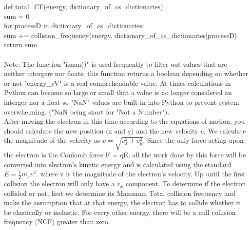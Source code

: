 \documentclass[12pt]{article}
\begin{document}
{\selectfont def total\_CF(energy, dictionary\_of\_cs\_dictionaries):\\
	\hspace*{2ex}sum = 0\\
	\hspace*{2ex}for processD in dictionary\_of\_cs\_dictionaries:\\
	\hspace*{4ex}sum += collision\_frequency(energy, dictionary\_of\_cs\_dictionaries[processD)\\
	\hspace*{2ex}return sum\\
	\\}
Note: The function "isnan()" is used frequently to filter out values that are neither intergers nor floats; this function returns a boolean depending on whether or not "energy\_eV" is a real comprehendable value. At times
calculations in Python can become so large or small that a value is no longer considered an interger nor a float so "NaN" values are built-in into Python to prevent system overwhelming.
("NaN being short for "Not a Number").\\




After moving the electron in this time according to the equations of motion, you should calculate the new position (x and y) and the new velocity $v$. We calculate the magnitude of the velocity as
$v = \sqrt{v_x ^2 + v_y ^2}$. Since the only force acting upon the electron is the Coulomb force F = qE, all the work done by this force will be converted into electron’s kinetic energy and is calculated 
using the standard $E = \frac{1}{2}m_e v^2$. where v is the magnitude of the electron’s velocity. Up until the first collision the electron will only have a $v_x$ component. To determine if the electron collided 
or not, first we determine its Maximum Total collision frequency and make the assumption that at that energy, the electron has to collide whether it be elastically or inelastic. For every other energy, there 
will be a null collision frequency (NCF) greater than zero. 
\end{document}
